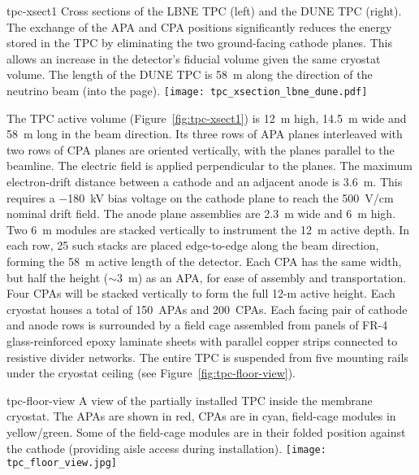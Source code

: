 \begin{cdrfigure}{tpc-xsect1}
{Cross sections of the LBNE  TPC (left) and the DUNE  TPC (right).  
The exchange of the APA and CPA positions significantly reduces the energy 
stored in the TPC by eliminating the two ground-facing cathode planes. 
This allows an increase in the detector's fiducial volume given the same cryostat volume. %
The length of the DUNE TPC is  58~m along the direction of the neutrino beam (into the page).}
\texttt{[image: tpc\_xsection\_lbne\_dune.pdf]}
\end{cdrfigure}
The TPC active volume (Figure~\ref{fig:tpc-xsect1}) is 12~m high,
14.5~m wide and 58~m long in the beam direction.  
Its three rows of APA planes interleaved with two rows of CPA planes
are oriented vertically, with the planes parallel to the beamline. The
electric field is applied perpendicular to the planes.  The maximum
electron-drift distance between a cathode and an adjacent anode is
3.6~m. This requires a $-$180~kV bias voltage on the cathode plane to
reach the 500~V/cm nominal drift field. The anode plane assemblies are
2.3~m wide and 6~m high. Two 6~m modules are stacked vertically to
instrument the 12~m active depth. In each row, 25 such stacks are
placed edge-to-edge along the beam direction, forming the 58~m active
length of the detector.  Each CPA has the same width, but half the
height ($\sim$3~m) as an APA, for ease of assembly and transportation.
Four CPAs will be stacked vertically to form the full 12-m active
height.  Each cryostat houses a total of 150~APAs and 200~CPAs.  Each
facing pair of cathode and anode rows is surrounded by a field
cage assembled from panels of FR-4 glass-reinforced epoxy laminate
sheets with parallel copper strips connected to resistive divider
networks.  The entire TPC is suspended from five mounting rails under the
cryostat ceiling (see Figure~\ref{fig:tpc-floor-view}).

\begin{cdrfigure}{tpc-floor-view}
{A view of the partially installed TPC inside the membrane cryostat.
  The APAs are shown in red, CPAs are in cyan, field-cage modules in
  yellow/green.  Some of the field-cage modules are in their folded
  position against the cathode (providing aisle access during installation).}
\texttt{[image: tpc\_floor\_view.jpg]}
\end{cdrfigure}

